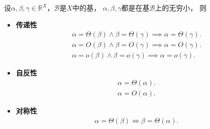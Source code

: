 \begin{proposition}%
设\(\alpha,\beta,\gamma\in\mathbb{R}^X\)，\(\mathcal{B}\)是\(X\)中的基，
\(\alpha,\beta,\gamma\)都是在基\(\mathcal{B}\)上的无穷小，
则\begin{itemize}
	\item {\rm\bf 传递性}\begin{gather*}
		\alpha = \Theta(\beta)
		\land
		\beta = \Theta(\gamma)
		\implies
		\alpha = \Theta(\gamma). \\
		\alpha = O(\beta)
		\land
		\beta = O(\gamma)
		\implies
		\alpha = O(\gamma). \\
		\alpha = o(\beta)
		\land
		\beta = o(\gamma)
		\implies
		\alpha = o(\gamma).
	\end{gather*}

	\item {\rm\bf 自反性}\begin{gather*}
		\alpha = \Theta(\alpha). \\
		\alpha = O(\alpha).
	\end{gather*}

	\item {\rm\bf 对称性}\begin{gather*}
		\alpha = \Theta(\beta)
		\iff
		\beta = \Theta(\alpha).
	\end{gather*}
\end{itemize}
\end{proposition}

